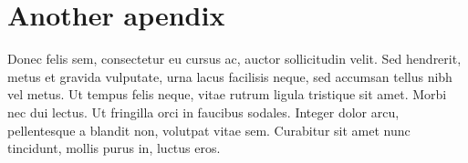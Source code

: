\documentclass{./styles/UoYCSproject}
\begin{document}
\chapter{Another apendix}
Donec felis sem, consectetur eu cursus ac, auctor sollicitudin velit. Sed hendrerit, metus et gravida vulputate, urna lacus facilisis neque, sed accumsan tellus nibh vel metus. Ut tempus felis neque, vitae rutrum ligula tristique sit amet. Morbi nec dui lectus. Ut fringilla orci in faucibus sodales. Integer dolor arcu, pellentesque a blandit non, volutpat vitae sem. Curabitur sit amet nunc tincidunt, mollis purus in, luctus eros.


\printbibliography
\end{document}
